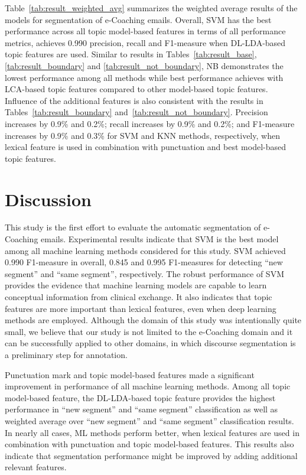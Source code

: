 \documentclass{amia}
\begin{document}
Table~\ref{tab:result_weighted_avg} summarizes the weighted average results of the models for segmentation of e-Coaching emails. Overall, SVM has the best performance across all topic model-based features in terms of all performance metrics, achieves 0.990 precision, recall and F1-measure when DL-LDA-based topic features are used. Similar to results in Tables~\ref{tab:result_base}, \ref{tab:result_boundary} and \ref{tab:result_not_boundary}, NB demonstrates the lowest performance among all methods while best performance achieves with LCA-based topic features compared to other model-based topic features. Influence of the additional features is also consistent with the results in Tables~\ref{tab:result_boundary} and~\ref{tab:result_not_boundary}. Precision increases by 0.9\% and 0.2\%; recall increases by 0.9\% and 0.2\%; and F1-measure increases by 0.9\% and 0.3\% for SVM and KNN methods, respectively, when lexical feature is used in combination with punctuation and best model-based topic features.\\

\section*{Discussion}
This study is the first effort to evaluate the automatic segmentation of e-Coaching emails. Experimental results indicate that SVM is the best model among all machine learning methods considered for this study. SVM achieved 0.990 F1-measure in overall, 0.845 and 0.995 F1-measures for detecting ``new segment'' and ``same segment'', respectively. The robust performance of SVM provides the evidence that machine learning models are capable to learn conceptual information from clinical exchange. It also indicates that topic features are more important than lexical features, even when deep learning methods are employed. Although the domain of this study was intentionally quite small, we believe that our study is not limited to the e-Coaching domain and it can be successfully applied to other domains, in which discourse segmentation is a preliminary step for annotation.

Punctuation mark and topic model-based features made a significant improvement in performance of all machine learning methods. Among all topic model-based feature, the DL-LDA-based topic feature provides the highest performance in ``new segment'' and ``same segment'' classification as well as weighted average over ``new segment'' and ``same segment'' classification results. In nearly all cases, ML methods perform better, when lexical features are used in combination with punctuation and topic model-based features. This results also indicate that segmentation performance might be improved by adding additional relevant features. \\       
\end{document}
